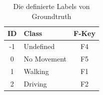 \begin{table}[]
	\caption{Die definierte Labels von Groundtruth}
	\label{tab:TabCalimotoLabelsID}
	\centering
		\begin{tabular}{|c|l|c|}
		\hline
		\textbf{ID} & \textbf{Class} & \textbf{F-Key} \\
		\hline
		-1 & Undefined & F4 \\ 
		\hline
		0 & No Movement & F5 \\ 
		\hline
		1 & Walking & F1 \\ 
		\hline
		2 & Driving & F2 \\ 
		\hline
	\end{tabular}
\end{table}





















